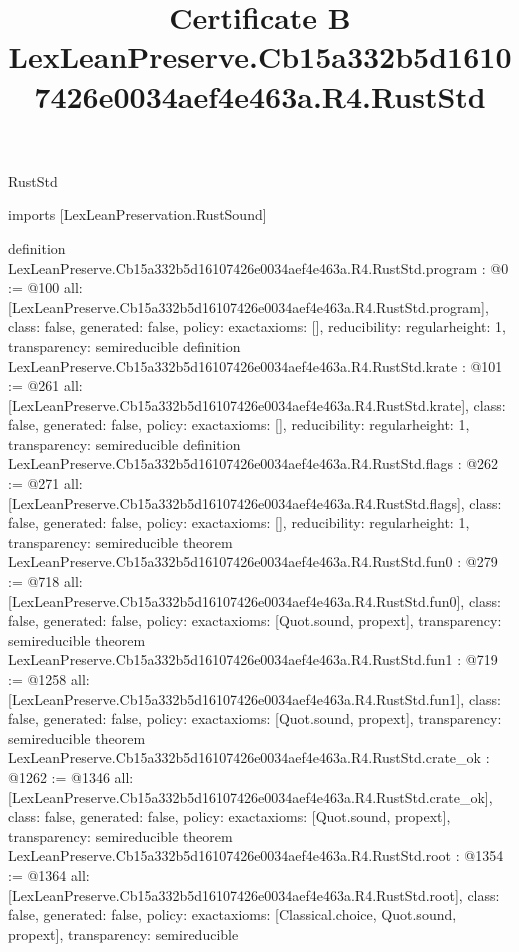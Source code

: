 \begin{lexlean}{RustStd}
\title{Certificate B LexLeanPreserve.Cb15a332b5d16107426e0034aef4e463a.R4.RustStd}
\begin{coremodule}
imports [LexLeanPreservation.RustSound]

definition LexLeanPreserve.Cb15a332b5d16107426e0034aef4e463a.R4.RustStd.program : @0 := @100 {
  all: [LexLeanPreserve.Cb15a332b5d16107426e0034aef4e463a.R4.RustStd.program],
  class: false,
  generated: false,
  policy: exact{axioms: []},
  reducibility: regular{height: 1},
  transparency: semireducible
}
definition LexLeanPreserve.Cb15a332b5d16107426e0034aef4e463a.R4.RustStd.krate : @101 := @261 {
  all: [LexLeanPreserve.Cb15a332b5d16107426e0034aef4e463a.R4.RustStd.krate],
  class: false,
  generated: false,
  policy: exact{axioms: []},
  reducibility: regular{height: 1},
  transparency: semireducible
}
definition LexLeanPreserve.Cb15a332b5d16107426e0034aef4e463a.R4.RustStd.flags : @262 := @271 {
  all: [LexLeanPreserve.Cb15a332b5d16107426e0034aef4e463a.R4.RustStd.flags],
  class: false,
  generated: false,
  policy: exact{axioms: []},
  reducibility: regular{height: 1},
  transparency: semireducible
}
theorem LexLeanPreserve.Cb15a332b5d16107426e0034aef4e463a.R4.RustStd.fun0 : @279 := @718 {
  all: [LexLeanPreserve.Cb15a332b5d16107426e0034aef4e463a.R4.RustStd.fun0],
  class: false,
  generated: false,
  policy: exact{axioms: [Quot.sound, propext]},
  transparency: semireducible
}
theorem LexLeanPreserve.Cb15a332b5d16107426e0034aef4e463a.R4.RustStd.fun1 : @719 := @1258 {
  all: [LexLeanPreserve.Cb15a332b5d16107426e0034aef4e463a.R4.RustStd.fun1],
  class: false,
  generated: false,
  policy: exact{axioms: [Quot.sound, propext]},
  transparency: semireducible
}
theorem LexLeanPreserve.Cb15a332b5d16107426e0034aef4e463a.R4.RustStd.crate_ok : @1262 := @1346 {
  all: [LexLeanPreserve.Cb15a332b5d16107426e0034aef4e463a.R4.RustStd.crate_ok],
  class: false,
  generated: false,
  policy: exact{axioms: [Quot.sound, propext]},
  transparency: semireducible
}
theorem LexLeanPreserve.Cb15a332b5d16107426e0034aef4e463a.R4.RustStd.root : @1354 := @1364 {
  all: [LexLeanPreserve.Cb15a332b5d16107426e0034aef4e463a.R4.RustStd.root],
  class: false,
  generated: false,
  policy: exact{axioms: [Classical.choice, Quot.sound, propext]},
  transparency: semireducible
}


\end{coremodule}
\end{lexlean}
